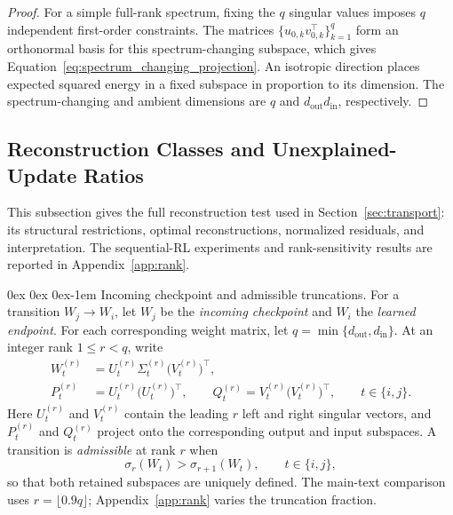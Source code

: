 \documentclass[11pt, a4paper]{utda}
\makeatletter
\renewcommand{\paragraph}{%
  \@startsection{paragraph}{4}%
  {\z@}{0ex \@plus 0ex \@minus 0ex}{-1em}%
  {\normalfont\normalsize\bfseries}%
}
\theoremstyle{plain}
\theoremstyle{definition}
\theoremstyle{remark}
\makeatother
\begin{document}
\begin{proof}
For a simple full-rank spectrum, fixing the $q$ singular values imposes $q$
independent first-order constraints. The matrices
$\{u_{0,k}v_{0,k}^\top\}_{k=1}^q$ form an orthonormal basis for this
spectrum-changing subspace, which gives
Equation~\ref{eq:spectrum_changing_projection}. An isotropic direction places
expected squared energy in a fixed subspace in proportion to its dimension.
The spectrum-changing and ambient dimensions are
$q$ and $d_{\mathrm{out}}d_{\mathrm{in}}$, respectively.
\end{proof}

\subsection{Reconstruction Classes and Unexplained-Update Ratios}


\label{app:frame_adaptability}

This subsection gives the full reconstruction test used in
Section~\ref{sec:transport}: its structural restrictions, optimal
reconstructions, normalized residuals, and interpretation.
The sequential-RL experiments and rank-sensitivity results are
reported in Appendix~\ref{app:rank}.

\paragraph{Incoming checkpoint and admissible truncations.}
For a transition $W_j\rightarrow W_i$, let $W_j$ be the
\emph{incoming checkpoint} and $W_i$ the \emph{learned endpoint}.
For each corresponding weight matrix, let
$q=\min\{d_{\mathrm{out}},d_{\mathrm{in}}\}$.
At an integer rank $1\leq r<q$, write
\begin{equation}
\label{eq:app-transport_truncation}
\begin{aligned}
    W_t^{(r)}
    &= U_t^{(r)}\Sigma_t^{(r)}\bigl(V_t^{(r)}\bigr)^\top,\\
    P_t^{(r)}
    &= U_t^{(r)}\bigl(U_t^{(r)}\bigr)^\top,
    \qquad
    Q_t^{(r)}
    = V_t^{(r)}\bigl(V_t^{(r)}\bigr)^\top,
    \qquad t\in\{i,j\}.
\end{aligned}
\end{equation}
Here $U_t^{(r)}$ and $V_t^{(r)}$ contain the leading $r$ left and
right singular vectors, and $P_t^{(r)}$ and $Q_t^{(r)}$ project
onto the corresponding output and input subspaces.
A transition is \emph{admissible} at rank $r$ when
\begin{equation}
\label{eq:app_rank_admissibility}
    \sigma_r(W_t)>\sigma_{r+1}(W_t),
    \qquad t\in\{i,j\},
\end{equation}
so that both retained subspaces are uniquely defined.
The main-text comparison uses $r=\lfloor0.9q\rfloor$;
Appendix~\ref{app:rank} varies the truncation fraction.
\end{document}
